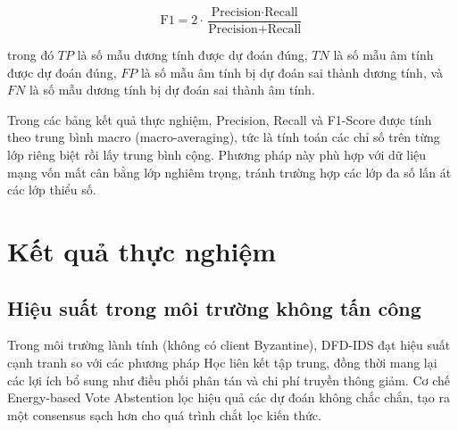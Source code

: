 \begin{equation}
\label{eq:f1}
\text{F1} = 2 \cdot \frac{\text{Precision} \cdot \text{Recall}}{\text{Precision} + \text{Recall}}
\end{equation}

trong đó $TP$ là số mẫu dương tính được dự đoán đúng, $TN$ là số mẫu âm tính được dự đoán đúng, $FP$ là số mẫu âm tính bị dự đoán sai thành dương tính, và $FN$ là số mẫu dương tính bị dự đoán sai thành âm tính.

Trong các bảng kết quả thực nghiệm, Precision, Recall và F1-Score được tính theo trung bình macro (macro-averaging), tức là tính toán các chỉ số trên từng lớp riêng biệt rồi lấy trung bình cộng. Phương pháp này phù hợp với dữ liệu mạng vốn mất cân bằng lớp nghiêm trọng, tránh trường hợp các lớp đa số lấn át các lớp thiểu số.

\section{Kết quả thực nghiệm}
\label{sec:results}

\subsection{Hiệu suất trong môi trường không tấn công}
Trong môi trường lành tính (không có client Byzantine), DFD-IDS đạt hiệu suất cạnh tranh so với các phương pháp Học liên kết tập trung, đồng thời mang lại các lợi ích bổ sung như điều phối phân tán và chi phí truyền thông giảm. Cơ chế Energy-based Vote Abstention lọc hiệu quả các dự đoán không chắc chắn, tạo ra một consensus sạch hơn cho quá trình chắt lọc kiến thức.

